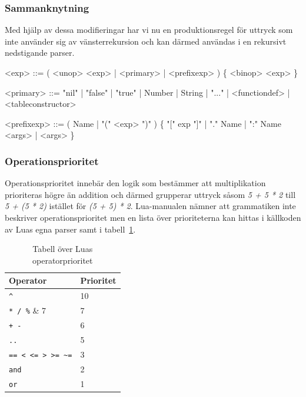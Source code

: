 \subsubsection{Sammanknytning}

Med hjälp av dessa modifieringar har vi nu en produktionsregel för uttryck som
inte använder sig av vänsterrekursion och kan därmed användas i en rekursivt
nedstigande parser.

\setlength{\grammarindent}{6em}
\begin{grammar}
  \singlespace\small%
  \selectfont
  <exp> ::= ( <unop> <exp> | <primary> | <prefixexp> ) \{ <binop> <exp> \}

  <primary> ::= "nil" | "false" | "true" | Number | String | "..." |
      <functiondef> | <tableconstructor>

  <prefixexp> ::= ( Name | "(" <exp> ")" ) \{ "[" exp "]" | "." Name |
      ":" Name <args> | <args> \}
\end{grammar}

\subsubsection{Operationsprioritet}

Operationsprioritet innebär den logik som bestämmer att multiplikation
prioriteras högre än addition och därmed grupperar uttryck såsom \textit{5 + 5
* 2} till \textit{5 + (5 * 2)} istället för \textit{(5 + 5) * 2}. Lua-manualen
nämner att grammatiken inte beskriver operationsprioritet \citep{luaref} men
en lista över prioriteterna kan hittas i källkoden av Luas egna parser
\citep{lparse} samt i tabell~\ref{tab:precedence}.

\begin{table}[ht]
  \caption{Tabell över Luas operatorprioritet}
  \begin{tabular}{l l}
    Operator & Prioritet \\
    \hline
    \verb|^| & 10 \\
    \verb|* / %| & 7 \\
    \verb|+ -| & 6 \\
    \verb|..| & 5 \\
    \verb|== < <= > >= ~=| & 3 \\
    \verb|and| & 2 \\
    \verb|or| & 1
  \end{tabular}
  \label{tab:precedence}
\end{table}

